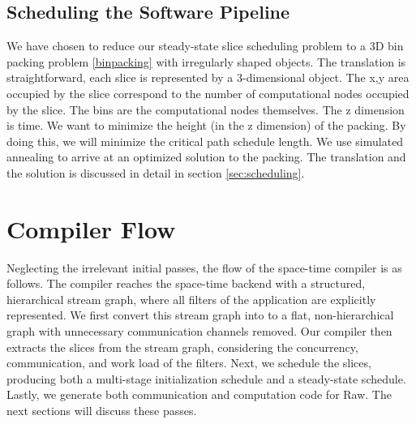 \subsection{Scheduling the Software Pipeline}
We have chosen to reduce our steady-state slice scheduling problem to
a 3D bin packing problem \ref{binpacking} with irregularly shaped
objects.  The translation is straightforward, each slice is
represented by a 3-dimensional object.  The x,y area occupied by
the slice correspond to the number of computational nodes occupied by
the slice.  The bins are the computational nodes themselves.  The z
dimension is time.  We want to minimize the height (in the z
dimension) of the packing.  By doing this, we will minimize the
critical path schedule length.  We use simulated annealing to arrive
at an optimized solution to the packing.  The translation and the
solution is discussed in detail in section \ref{sec:scheduling}.

\section{Compiler Flow}
Neglecting the irrelevant initial passes, the flow of the space-time
compiler is as follows.  The compiler reaches the space-time backend
with a structured, hierarchical stream graph, where all filters of the
application are explicitly represented.  We first convert this stream
graph into to a flat, non-hierarchical graph with unnecessary
communication channels removed.  Our compiler then extracts the
slices from the stream graph, considering the concurrency,
communication, and work load of the filters.
Next, we schedule the slices, producing both a multi-stage
initialization schedule and a steady-state schedule.  Lastly, we
generate both communication and computation code for Raw.  The next
sections will discuss these passes.